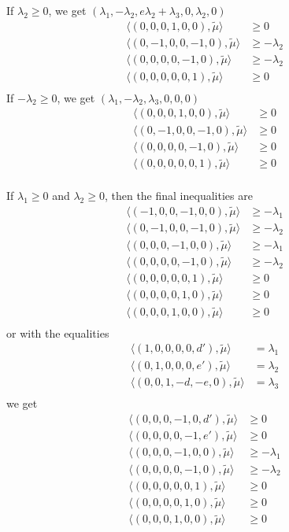 \documentclass{amsart}
\numberwithin{theorem}{section}
\begin{document}
  If $\lambda_2 \ge 0$, we get $(\lambda_1,-\lambda_2,e\lambda_2+\lambda_3,0,\lambda_2,0)$
  \begin{align*}
    \langle (0,0,0,1,0,0), \tilde\mu\rangle &\ge 0\\ 
    \langle (0,-1,0,0,-1,0), \tilde\mu\rangle &\ge -\lambda_2\\ 
    \langle (0,0,0,0,-1,0), \tilde\mu\rangle &\ge -\lambda_2\\ 
    \langle (0,0,0,0,0,1), \tilde\mu\rangle &\ge 0\\ 
  \end{align*}
  If $-\lambda_2 \ge 0$, we get $(\lambda_1,-\lambda_2,\lambda_3,0,0,0)$
  \begin{align*}
    \langle (0,0,0,1,0,0), \tilde\mu\rangle &\ge 0\\ 
    \langle (0,-1,0,0,-1,0), \tilde\mu\rangle &\ge 0\\ 
    \langle (0,0,0,0,-1,0), \tilde\mu\rangle &\ge 0\\ 
    \langle (0,0,0,0,0,1), \tilde\mu\rangle &\ge 0\\ 
  \end{align*}

  If $\lambda_1 \ge 0$ and $\lambda_2 \ge 0$, then the final inequalities are
  \begin{align*}
    \langle (-1,0,0,-1,0,0), \tilde\mu\rangle &\ge -\lambda_1\\ 
    \langle (0,-1,0,0,-1,0), \tilde\mu\rangle &\ge -\lambda_2\\ 
    \langle (0,0,0,-1,0,0), \tilde\mu\rangle &\ge -\lambda_1\\ 
    \langle (0,0,0,0,-1,0), \tilde\mu\rangle &\ge -\lambda_2\\ 
    \langle (0,0,0,0,0,1), \tilde\mu\rangle &\ge 0\\ 
    \langle (0,0,0,0,1,0), \tilde\mu\rangle &\ge 0\\ 
    \langle (0,0,0,1,0,0), \tilde\mu\rangle &\ge 0\\ 
  \end{align*}
  or with the equalities
  \begin{align*}
    \langle (1,0,0,0,0,d'), \tilde\mu\rangle &= \lambda_1\\ 
    \langle (0,1,0,0,0,e'), \tilde\mu\rangle &= \lambda_2\\ 
    \langle (0,0,1,-d,-e,0), \tilde\mu\rangle &= \lambda_3\\ 
  \end{align*}
  we get
  \begin{align*}
    \langle (0,0,0,-1,0,d'), \tilde\mu\rangle &\ge 0\\ 
    \langle (0,0,0,0,-1,e'), \tilde\mu\rangle &\ge 0\\ 
    \langle (0,0,0,-1,0,0), \tilde\mu\rangle &\ge -\lambda_1\\ 
    \langle (0,0,0,0,-1,0), \tilde\mu\rangle &\ge -\lambda_2\\ 
    \langle (0,0,0,0,0,1), \tilde\mu\rangle &\ge 0\\ 
    \langle (0,0,0,0,1,0), \tilde\mu\rangle &\ge 0\\ 
    \langle (0,0,0,1,0,0), \tilde\mu\rangle &\ge 0\\ 
  \end{align*}
  \newpage
\end{document}
